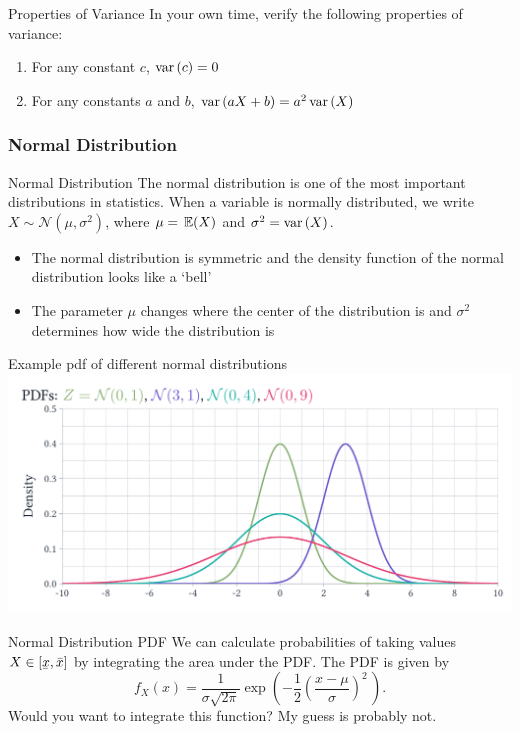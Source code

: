 \documentclass[aspectratio=169,t,11pt,table]{beamer}
\begin{document}
\begin{frame}{ Properties of Variance}
  In your own time, verify the following properties of variance:
  \begin{enumerate}
    \item For any constant $c$, $\var{c} = 0$
    \item For any constants $a$ and $b$, $\var{aX + b} = a^2 \var{X}$
  \end{enumerate}
\end{frame}

\subsubsection*{Normal Distribution}
\begin{frame}{Normal Distribution}
  The normal distribution is one of the most important distributions in statistics. When a variable is normally distributed, we write $X \sim \mathcal{N}(\mu, \sigma^2)$, where $\mu = \expec{X}$ and $\sigma^2 = \var{X}$.
  \begin{itemize}
    \item The normal distribution is symmetric and the density function of the normal distribution looks like a `bell'
  
    \item The parameter $\mu$ changes where the center of the distribution is and $\sigma^2$ determines how wide the distribution is
  \end{itemize}
\end{frame}

\begin{frame}{Example pdf of different normal distributions}
  \includegraphics[width = \textwidth]{figures/ex_normal_dist.pdf}
\end{frame}

\begin{frame}{Normal Distribution PDF}
  We can calculate probabilities of taking values $X \in [\ubar{x}, \bar{x}]$ by integrating the area under the PDF. The PDF is given by
  \pause
  $$
    f_X(x) = \frac{1}{\sigma\sqrt{2\pi}} \exp\left( -\frac{1}{2}\left(\frac{x-\mu}{\sigma}\right)^{\!2}\,\right).
  $$
  \bigskip
  Would you want to integrate this function? My guess is probably not.
\end{frame}
\end{document}
